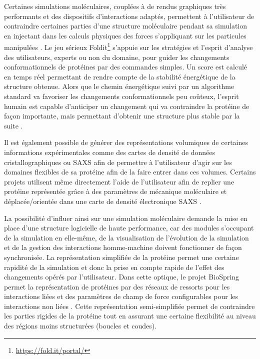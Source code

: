 Certaines simulations moléculaires, couplées à de rendus graphiques très performants et des dispositifs d'interactions adaptés, permettent à l'utilisateur de contraindre certaines parties d'une structure moléculaire pendant sa simulation en injectant dans les calculs physiques des forces s'appliquant sur les particules manipulées \cite{bolopion_comparing_2010}. Le jeu sérieux Foldit\footnote{\url{https://fold.it/portal/}} s'appuie sur les stratégies et l'esprit d'analyse des utilisateurs, experts ou non du domaine, pour guider les changements conformationnels de protéines par des commandes simples. Un score est calculé en temps réel permettant de rendre compte de la stabilité énergétique de la structure obtenue. Alors que le chemin énergétique suivi par un algorithme standard va favoriser les changements conformationnels peu coûteux, l'esprit humain est capable d'anticiper un changement qui va contraindre la protéine de façon importante, mais permettant d'obtenir une structure plus stable par la suite \cite{khatib2011crystal}.

Il est également possible de générer des représentations volumiques de certaines informations expérimentales comme des cartes de densité de données cristallographiques ou SAXS afin de permettre à l'utilisateur d'agir sur les domaines flexibles de sa protéine afin de la faire entrer dans ces volumes. Certains projets utilisent même directement l'aide de l'utilisateur afin de replier une protéine représentée grâce à des paramètres de mécanique moléculaire et déplacée/orientée dans une carte de densité électronique SAXS \cite{molza2014innovative,tek2012advances}.

La possibilité d'influer ainsi sur une simulation moléculaire demande la mise en place d'une structure logicielle de haute performance, car des modules s'occupant de la simulation en elle-même, de la visualisation de l'évolution de la simulation et de la gestion des interactions homme-machine doivent fonctionner de façon synchronisée.
La représentation simplifiée de la protéine permet une certaine rapidité de la simulation et donc la prise en compte rapide de l'effet des changements opérés par l'utilisateur. Dans cette optique, le projet BioSpring permet la représentation de protéines par des réseaux de ressorts pour les interactions liées et des paramètres de champ de force configurables pour les interactions non liées \cite{ferey2012biospring}. Cette représentation semi-simplifiée permet de contraindre les parties rigides de la protéine tout en assurant une certaine flexibilité au niveau des régions moins structurées (boucles et coudes).

